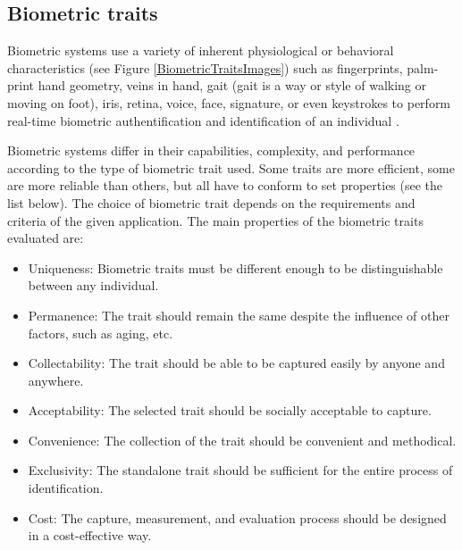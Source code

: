 
\subsection{Biometric traits}
\label{Biometric traits}
Biometric systems use a variety of inherent physiological or behavioral characteristics (see Figure \ref{BiometricTraitsImages}) such as fingerprints, palm-print hand geometry, veins in hand, gait (gait is a way or style of walking or moving on foot), iris, retina, voice, face, signature, or even keystrokes \cite{biometricTraitsSpec} to perform real-time biometric authentification and identification of an individual \cite{DrahanskyMartin2011B}.

Biometric systems differ in their capabilities, complexity, and performance according to the type of biometric trait used. Some traits are more efficient, some are more reliable than others, but all have to conform to set properties (see the list below). The choice of biometric trait depends on the requirements and criteria of the given application. The main properties of the biometric traits evaluated are\cite{clarke1994human}:
\begin{itemize}
    \item Uniqueness: Biometric traits must be different enough to be distinguishable between any individual.  
    \item Permanence: The trait should remain the same despite the influence of other factors, such as aging, etc. 
    \item Collectability: The trait should be able to be captured easily by anyone and anywhere. 
    \item Acceptability: The selected trait should be socially acceptable to capture. 
    \item Convenience: The collection of the trait should be convenient and methodical. 
    \item Exclusivity: The standalone trait should be sufficient for the entire process of identification.
    \item Cost: The capture, measurement, and evaluation process should be designed in a cost-effective way.
\end{itemize}


